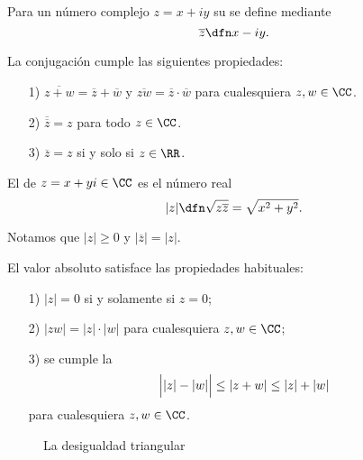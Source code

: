 Para un número complejo $z = x + iy$ su  se define mediante
$$\overline{z} \dfn x - iy.$$

\begin{observacionejerc}
  La conjugación cumple las siguientes propiedades:

  \begin{enumerate}
  \item[1)] $\overline{z+w} = \overline{z} + \overline{w}$ y
    $\overline{zw} = \overline{z}\cdot\overline{w}$ para cualesquiera
    $z,w \in \CC$.

  \item[2)] $\overline{\overline{z}} = z$ para todo $z \in \CC$.

  \item[3)] $\overline{z} = z$ si y solo si $z \in \RR$. \qedhere
  \end{enumerate}
\end{observacionejerc}

\begin{definicion}
  El  de $z = x + yi \in \CC$ es el número real
  $$|z| \dfn \sqrt{z \overline{z}} = \sqrt{x^2 + y^2}.$$
\end{definicion}

Notamos que $|z| \ge 0$ y $|\overline{z}| = |z|$.

\begin{observacionejerc}
  El valor absoluto satisface las propiedades habituales:
  \begin{enumerate}
  \item[1)] $|z| = 0$ si y solamente si $z = 0$;

  \item[2)] $|zw| = |z|\cdot |w|$ para cualesquiera $z,w\in \CC$;

  \item[3)] se cumple la 
    $$\Bigl| |z| - |w| \Bigr|\le |z+w| \le |z| + |w|$$
    para cualesquiera $z,w\in \CC$. \qedhere
  \end{enumerate}
\end{observacionejerc}

\begin{figure}[h]
  \begin{center}
  \end{center}

  \caption{La desigualdad triangular}
\end{figure}

